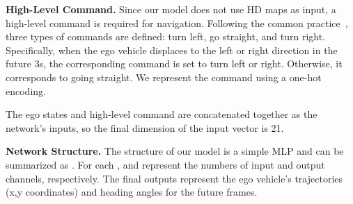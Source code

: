 \documentclass[10pt,twocolumn,letterpaper]{article}
\newcommand{\myPara}[1]{\vspace{.05in}\noindent\textbf{#1.}\quad}
\begin{document}
\myPara{High-Level Command}
Since our model does not use HD maps as input, a high-level command is required for navigation. 
Following the common practice~\cite{hu2022st,hu2022goal}, three types of commands are defined: 
turn left, go straight, and turn right. 
Specifically, when the ego vehicle displaces  to the left or right direction in the future 3s, the corresponding command is set to turn left or right. 
Otherwise, it corresponds to going straight. 
We represent the command using a  one-hot encoding.  

The ego states and high-level command are 
concatenated together as the network's inputs, so the final dimension of the input vector is 21.

\myPara{Network Structure}
The structure of our model is a simple
MLP 
and can be summarized as .
For each , 
 and  represent the numbers of 
input and output channels, respectively.
The final outputs represent the ego vehicle's trajectories (x,y coordinates) and heading angles for the future  frames.
\end{document}
